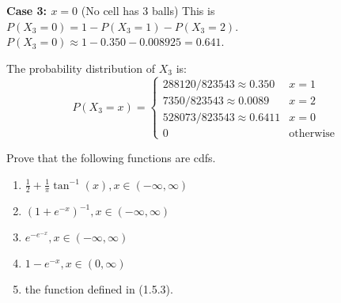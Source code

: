 \textbf{Case 3: $x=0$} (No cell has 3 balls)
This is $P(X_3=0) = 1 - P(X_3=1) - P(X_3=2)$.
$P(X_3=0) \approx 1 - 0.350 - 0.008925 = 0.641$.

The probability distribution of $X_3$ is:
\[ P(X_3=x) = \begin{cases}
    288120/823543 \approx 0.350 & x=1 \\
    7350/823543 \approx 0.0089 & x=2 \\
    528073/823543 \approx 0.6411 & x=0 \\
    0 & \text{otherwise}
\end{cases}
\]


\begin{problembox}
Prove that the following functions are cdfs.
\begin{enumerate}[label=(\alph*)]
    \item $\frac{1}{2}+\frac{1}{\pi}\tan^{-1}(x),x\in(-\infty,\infty)$
    \item $(1+e^{-x})^{-1},x\in(-\infty,\infty)$
    \item $e^{-e^{-x}},x\in(-\infty,\infty)$
    \item $1-e^{-x},x\in(0,\infty)$
    \item the function defined in (1.5.3).
\end{enumerate}
\end{problembox}

